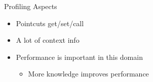 \begin{frame}{Profiling Aspects}



  \begin{itemize}
\item Pointcuts get/set/call %
\item A lot of context info  %
\item Performance is important in this domain
\begin{itemize}
\item More knowledge improves performance
\end{itemize}
\end{itemize}
\end{frame}
